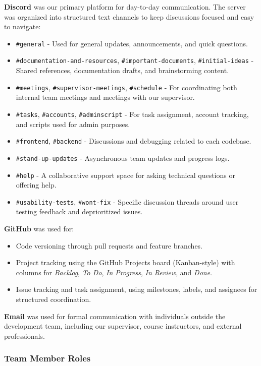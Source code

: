 \documentclass{article}
\begin{document}
\textbf{Discord} was our primary platform for day-to-day communication. The server was organized into structured text channels to keep discussions focused and easy to navigate:
\begin{itemize}
    \item \texttt{\#general} - Used for general updates, announcements, and quick questions.
    \item \texttt{\#documentation-and-resources}, \texttt{\#important-documents}, 
    \texttt{\#initial-ideas} - Shared references, documentation drafts, and brainstorming content.
    \item \texttt{\#meetings}, \texttt{\#supervisor-meetings}, \texttt{\#schedule} 
    - For coordinating both internal team meetings and meetings with our supervisor.
    \item \texttt{\#tasks}, \texttt{\#accounts}, \texttt{\#adminscript} 
    - For task assignment, account tracking, and scripts used for admin purposes.
    \item \texttt{\#frontend}, \texttt{\#backend} 
    - Discussions and debugging related to each codebase.
    \item \texttt{\#stand-up-updates} - Asynchronous team updates and progress logs.
    \item \texttt{\#help} - A collaborative support space for asking technical questions or offering help.
    \item \texttt{\#usability-tests}, \texttt{\#wont-fix} - Specific discussion threads around user testing feedback and deprioritized issues.
\end{itemize}

\textbf{GitHub} was used for:
\begin{itemize}
    \item Code versioning through pull requests and feature branches.
    \item Project tracking using the GitHub Projects board (Kanban-style) with columns for \textit{Backlog}, \textit{To Do}, \textit{In Progress}, \textit{In Review}, and \textit{Done}.
    \item Issue tracking and task assignment, using milestones, labels, and assignees for structured coordination.
\end{itemize}

\textbf{Email} was used for formal communication with individuals outside the development team, including our supervisor, course instructors, and external professionals.

\subsubsection{Team Member Roles}
\end{document}
